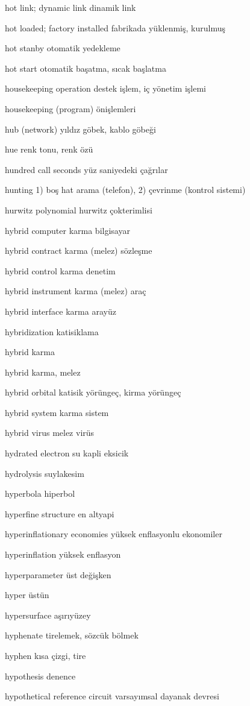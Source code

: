 \documentclass[12pt,fleqn]{article}\usepackage{../../common}
\begin{document}
hot link; dynamic link dinamik link

hot loaded; factory installed fabrikada yüklenmiş, kurulmuş

hot stanby otomatik yedekleme

hot start otomatik başatma, sıcak başlatma

housekeeping operation destek işlem, iç yönetim işlemi

housekeeping (program) önişlemleri

hub (network) yıldız göbek, kablo göbeği

hue renk tonu, renk özü

hundred call seconds yüz saniyedeki çağrılar

hunting 1) boş hat arama (telefon), 2) çevrinme (kontrol sistemi)

hurwitz polynomial hurwitz çokterimlisi

hybrid computer karma bilgisayar

hybrid contract karma (melez) sözleşme

hybrid control karma denetim

hybrid instrument karma (melez) araç

hybrid interface karma arayüz

hybridization katisiklama

hybrid karma

hybrid karma, melez

hybrid orbital katisik yörüngeç, kirma yörüngeç

hybrid system karma sistem

hybrid virus melez virüs

hydrated electron su kapli eksicik

hydrolysis suylakesim

hyperbola hiperbol

hyperfine structure en altyapi

hyperinflationary economies yüksek enflasyonlu ekonomiler

hyperinflation yüksek enflasyon

hyperparameter üst değişken

hyper üstün

hypersurface aşırıyüzey

hyphenate tirelemek, sözcük bölmek

hyphen kısa çizgi, tire

hypothesis denence

hypothetical reference circuit varsayımsal dayanak devresi
\end{document}
